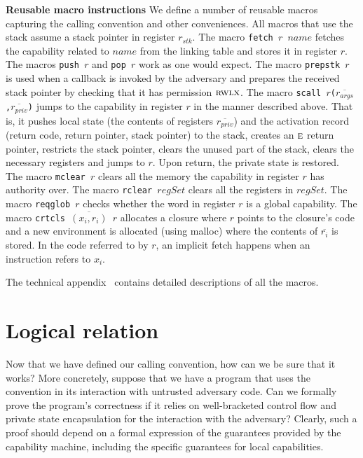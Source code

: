 \documentclass{llncs}
\newcommand{\var}[1]{\mathit{#1}}
\newcommand{\stk}{\var{stk}}
\newcommand{\plainperm}[1]{\textsc{#1}}
\newcommand{\entry}{\plainperm{e}}
\newcommand{\rwlx}{\plainperm{rwlx}}
\begin{document}
\textbf{Reusable macro instructions} We define a number of reusable
macros capturing the calling convention and other conveniences. All
macros that use the stack assume a stack pointer in register
$r_\stk$. The macro \texttt{\footnotesize{fetch $r$ $\var{name}$}} fetches the
capability related to $\var{name}$ from the linking table and stores
it in register $r$.  The macros \texttt{\footnotesize{push $r$}} and
\texttt{\footnotesize{pop $r$}} work as one would
expect. The macro \texttt{\footnotesize{prepstk $r$}} is used when a callback is
invoked by the adversary and prepares the received stack pointer by
checking that it has permission $\rwlx$.  The macro \texttt{\footnotesize{scall
    $r$($\overline{r_{\var{args}}}$,$\overline{r_{\var{priv}}}$)}}
jumps to the capability in register $r$ in the manner described
above. That is, it pushes local state (the contents of registers
$\overline{r_{\var{priv}}}$) and the activation record (return code,
return pointer, stack pointer) to the stack, creates an $\entry$
return pointer, restricts the stack pointer, clears the unused part of
the stack, clears the necessary registers and jumps to $r$.  Upon
return, the private state is restored. The macro \texttt{\footnotesize{mclear
    $r$}} clears all the memory the capability in register $r$ has
authority over.  The macro \texttt{\footnotesize{rclear $\var{regSet}$}} clears
all the registers in $\var{regSet}$. The macro \texttt{\footnotesize{reqglob
    $r$}} checks whether the word in register $r$ is a global
capability. The macro \texttt{\footnotesize{crtcls $\overline{(x_i,r_i)}$ $r$}}
allocates a closure where $r$ points to the closure's code and a new
environment is allocated (using malloc) where the contents of
$\overline{r_i}$ is stored. In the code referred to by $r$, an
implicit fetch happens when an instruction refers to $x_i$.

The technical appendix~\cite{technical_appendix} contains detailed descriptions
of all the macros.

\section{Logical relation}
\label{sec:logical-relation}
Now that we have defined our calling convention, how can we be sure that it
works? More concretely, suppose that we have a program that uses the convention
in its interaction with untrusted adversary code. Can we formally prove the
program's correctness if it relies on well-bracketed control flow and private
state encapsulation for the interaction with the adversary? Clearly, such a
proof should depend on a formal expression of the guarantees provided by the
capability machine, including the specific guarantees for local capabilities.
\end{document}
